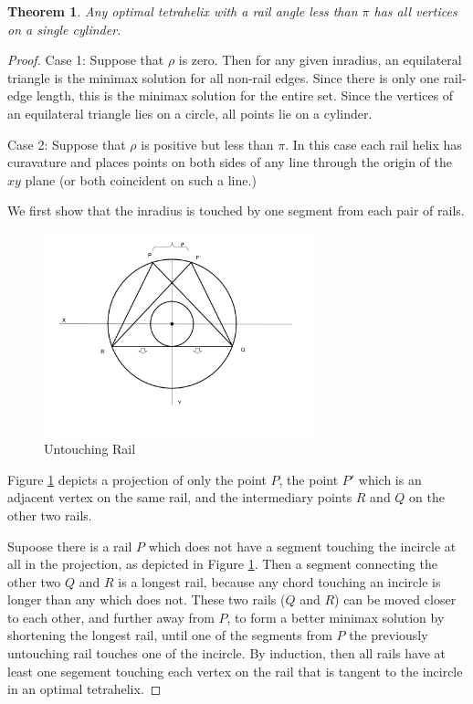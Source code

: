 \documentclass[11pt]{article}
\newtheorem{theorem}{Theorem}
\begin{document}
\begin{theorem}
  \label{thm:cylinder}
  Any optimal tetrahelix with a rail angle less than $\pi$ has all vertices on a single cylinder.
\end{theorem}

\begin{proof}

Case 1: Suppose that $\rho$ is zero. Then for any given inradius, an equilateral
triangle is the minimax solution for all non-rail edges. Since there is only
one rail-edge length, this is the minimax solution for the entire set. Since
the vertices of an equilateral triangle lies on a circle, all points lie on
a cylinder.

Case 2: Suppose that $\rho$ is positive but less than $\pi$.
In this case each rail helix has
curavature and places points on both sides of any line through the origin
of the $xy$ plane (or both coincident on such a line.)

We first show that the inradius is touched by one segment from each pair
of rails.

\begin{figure}[H]
  \label{untouchingrailfig}
     \centering
     \includegraphics[width=0.7\textwidth]{figures/UntouchingRail.png}
     \caption{Untouching Rail}
\end{figure}

Figure \ref{untouchingrailfig} depicts a projection of
only the point $P$, the point $P'$ which is an adjacent vertex on the same rail,
and the intermediary points $R$ and $Q$ on the other two rails.

Supoose there is a rail $P$ which does not have a segment touching the incircle
at all in the projection, as depicted in Figure \ref{untouchingrailfig}.
Then a segment connecting the other two $Q$ and $R$ is a longest
rail, because any chord touching an incircle is longer than any which does not.
These two rails ($Q$ and $R$) can be moved closer to each other, and further away from $P$, to form a better minimax solution
by shortening the longest rail, until one of the segments from $P$ the previously
untouching rail touches one of the incircle. By induction, then all rails have
at least one segement touching each vertex on the rail that is tangent to the
incircle in an optimal tetrahelix.


\end{proof}
\end{document}
